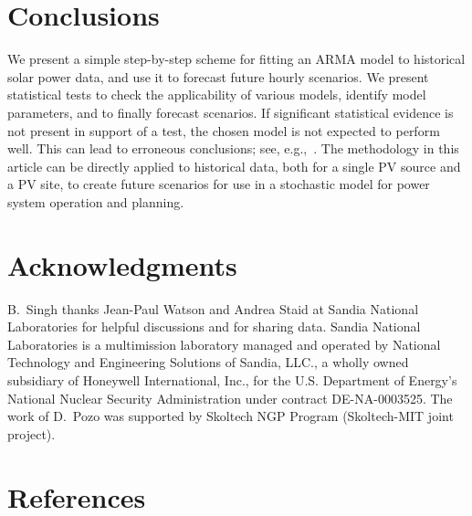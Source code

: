 \documentclass[review]{elsarticle}
\begin{document}
\section{Conclusions}
We present a simple step-by-step scheme for fitting an ARMA model to 
historical solar power data, and use it to forecast future hourly scenarios. 
We present statistical tests to check the applicability of various models, 
identify model parameters, and to finally forecast scenarios. If significant 
statistical evidence is not present in support of a 
test, the chosen model is not expected to perform well. This can lead to 
erroneous conclusions; see, 
e.g.,~\cite{kwiatkowski1992testing,phillips1988testing}.
The methodology in this article can be directly applied to historical data, 
both for a single PV source and a PV site,
to create future scenarios for use in a stochastic model for power system 
operation and planning.




\section*{Acknowledgments} 
B.\ Singh thanks Jean-Paul Watson and Andrea Staid at Sandia National 
Laboratories for helpful discussions and for sharing data. 
Sandia National Laboratories is a multimission laboratory managed and operated 
by National Technology and Engineering Solutions of Sandia, LLC., a wholly owned
subsidiary of Honeywell International, Inc., for the U.S. Department of 
Energy's 
National Nuclear Security Administration under contract DE-NA-0003525.
The work of D.\ Pozo was supported by Skoltech NGP Program (Skoltech-MIT joint 
project).

\section*{References}


\end{document}
